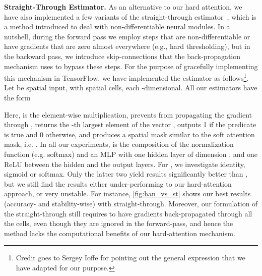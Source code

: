 \noindent\textbf{Straight-Through Estimator.}
As an alternative to our hard attention, we have also implemented a few variants of the straight-through estimator~\cite{bengio2013estimating}, which is a method introduced to deal with non-differentiable neural modules.
In a nutshell, during the forward pass we employ steps that are non-differentiable or have gradients that are zero almost everywhere (e.g., hard thresholding), but in the backward pass, we introduce skip-connections that the back-propagation mechanism uses to bypass these steps.
For the purpose of gracefully implementing this mechanism in TensorFlow, we have implemented the estimator as follows\footnote{Credit goes to Sergey Ioffe for pointing out the general expression that we have adapted for our purpose.}. Let  be spatial input, with  spatial cells, each -dimensional. All our estimators have the form

Here,  is the element-wise multiplication,  prevents from propagating the gradient through ,   returns the -th largest element of the vector ,  outputs 1 if the predicate  is true and 0 otherwise, and  produces a spatial mask similar to the soft attention mask, i.e. . In all our experiments,  is the composition of the normalization function (e.g. softmax)  and an MLP  with one hidden layer of dimension , and one ReLU between the hidden and the output layers. For , we investigate identity, sigmoid or softmax. Only the latter two yield results significantly better than , but we still find the results either under-performing to our hard-attention approach, or very unstable. For instance, \autoref{fig:han_vs_st} shows our best results (accuracy- and stability-wise) with straight-through. Moreover, our formulation of the straight-through still requires to have gradients back-propagated through all the cells, even though they are ignored in the forward-pass, and hence the method lacks the computational benefits of our hard-attention mechanism.


